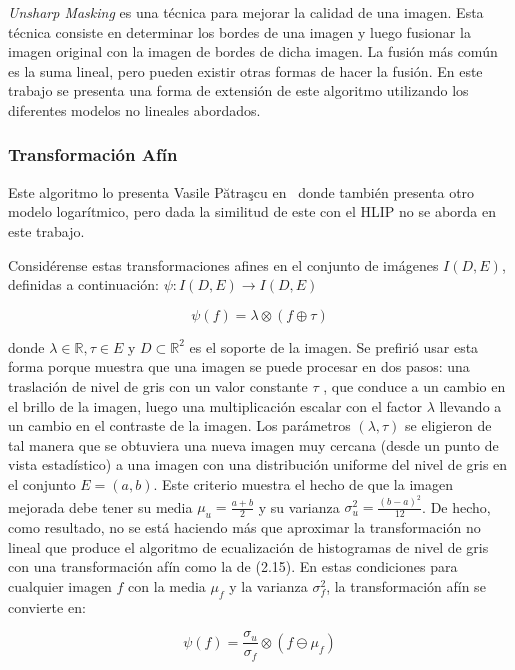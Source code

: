 \textit{Unsharp Masking} es una t\'ecnica para mejorar la calidad de una imagen. Esta t\'ecnica consiste en determinar los bordes de una imagen y luego fusionar la imagen original con la imagen de bordes de dicha imagen. La fusi\'on m\'as com\'un es la suma lineal, pero pueden existir otras formas de hacer la fusi\'on. En este trabajo se presenta una forma de extensi\'on de este algoritmo utilizando los diferentes modelos no lineales abordados.

\subsubsection{Transformaci\'on Af\'in}

Este algoritmo lo presenta Vasile Pătraşcu en~\cite{patrascu2003gray} donde tambi\'en presenta otro modelo logar\'itmico, pero dada la similitud de este con el HLIP no se aborda en este trabajo.

Consid\'erense estas transformaciones afines en el conjunto de imágenes $I (D, E)$, definidas a continuaci\'on: $\psi : I (D, E) \to I (D, E )$

\begin{equation}
	\psi(f)=\lambda\otimes(f\oplus\tau)
\end{equation}

donde $\lambda \in \mathbb{R}, \tau \in E$ y $D\subset\mathbb{R}^2$ es el soporte de la imagen. Se prefirió usar esta forma porque muestra que una imagen se puede procesar en dos pasos: una traslación de nivel de gris con un valor constante $\tau$ , que conduce a un cambio en el brillo de la imagen, luego una multiplicación escalar con el factor $\lambda$  llevando a un cambio en el contraste de la imagen. Los parámetros $(\lambda, \tau )$ se eligieron de tal manera que se obtuviera una nueva imagen muy cercana (desde un punto de vista estadístico) a una imagen con una distribución uniforme del nivel de gris en el conjunto $E=(a,b)$. Este criterio muestra el hecho de que la imagen mejorada debe tener su media $\mu_u = \frac{a+b}{2}$ y su varianza $\sigma_u^2 = \frac{(b-a)^2}{12}$. De hecho, como resultado, no se est\'a haciendo más que aproximar la transformaci\'on no lineal que produce el algoritmo de ecualización de histogramas de nivel de gris con una transformaci\'on afín como la de (2.15). En estas condiciones para cualquier imagen $f$ con la media $\mu_f$ y la varianza $\sigma_f^2 $, la transformaci\'on afín  se convierte en:

\begin{equation}
	\psi(f)=\frac{\sigma_u}{\sigma_f}\otimes(f\ominus\mu_f)
\end{equation}

